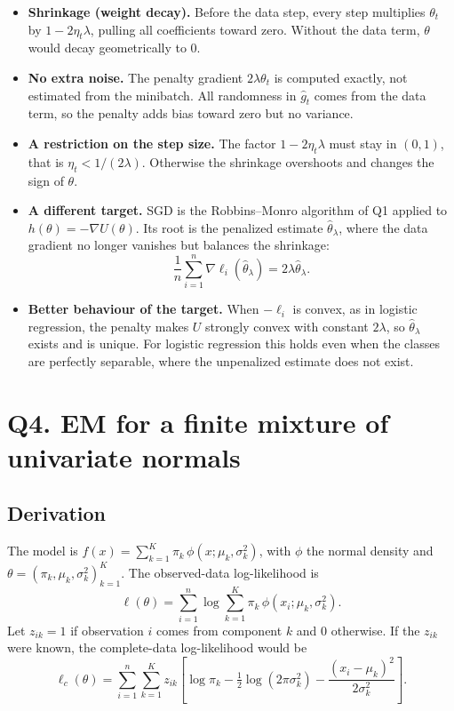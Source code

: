 \documentclass[11pt]{article}
\begin{document}
\begin{itemize}
\item \textbf{Shrinkage (weight decay).} Before the data step, every step multiplies $\theta_t$ by
$1-2\eta_t\lambda$, pulling all coefficients toward zero. Without the data term, $\theta$ would decay
geometrically to 0.
\item \textbf{No extra noise.} The penalty gradient $2\lambda\theta_t$ is computed exactly, not estimated from
the minibatch. All randomness in $\hat g_t$ comes from the data term, so the penalty adds bias toward zero but no
variance.
\item \textbf{A restriction on the step size.} The factor $1-2\eta_t\lambda$ must stay in $(0,1)$, that is
$\eta_t<1/(2\lambda)$. Otherwise the shrinkage overshoots and changes the sign of $\theta$.
\item \textbf{A different target.} SGD is the Robbins--Monro algorithm of Q1 applied to $h(\theta)=-\nabla U(\theta)$.
Its root is the penalized estimate $\hat\theta_\lambda$, where the data gradient no longer vanishes but balances
the shrinkage:
\[
\frac1n\sum_{i=1}^n\nabla\ell_i(\hat\theta_\lambda)=2\lambda\hat\theta_\lambda .
\]
\item \textbf{Better behaviour of the target.} When $-\ell_i$ is convex, as in logistic regression, the penalty
makes $U$ strongly convex with constant $2\lambda$, so $\hat\theta_\lambda$ exists and is unique. For logistic
regression this holds even when the classes are perfectly separable, where the unpenalized estimate does not
exist.
\end{itemize}

\newpage
\section*{Q4. EM for a finite mixture of univariate normals}

\subsection*{Derivation}

The model is $f(x)=\sum_{k=1}^K\pi_k\,\phi(x;\mu_k,\sigma_k^2)$, with $\phi$ the normal density and
$\theta=(\pi_k,\mu_k,\sigma_k^2)_{k=1}^K$. The observed-data log-likelihood is
\[
\ell(\theta)=\sum_{i=1}^n\log\sum_{k=1}^K\pi_k\,\phi(x_i;\mu_k,\sigma_k^2).
\]
Let $z_{ik}=1$ if observation $i$ comes from component $k$ and 0 otherwise. If the $z_{ik}$ were known, the
complete-data log-likelihood would be
\[
\ell_c(\theta)=\sum_{i=1}^n\sum_{k=1}^K z_{ik}\left[\log\pi_k-\tfrac12\log(2\pi\sigma_k^2)
-\frac{(x_i-\mu_k)^2}{2\sigma_k^2}\right].
\]
\end{document}
